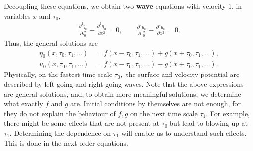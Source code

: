 \documentclass[10pt,reqno,oneside,a4paper]{article}
\begin{document}
Decoupling these equations, we obtain two \textbf{wave} equations with velocity 1, in variables $x$ and $\tau_0,$
\begin{align*}
\frac{\partial^2 \eta_{0}}{\partial \tau_0^2} - \frac{\partial^2\eta_{0}}{\partial x^2} = 0, \qquad \frac{\partial^2 u_{0}}{\partial \tau_0^2} - \frac{\partial^2 u_{0}}{\partial x^2} = 0.
\end{align*}
Thus, the general solutions are
\begin{align*}
\eta_{0}(x, \tau_0, \tau_1, \ldots) &= f(x- \tau_0, \tau_1, \ldots) + g(x+ \tau_0, \tau_1, \ldots), \\
u_{0}(x, \tau_0, \tau_1, \ldots) &= f(x- \tau_0, \tau_1, \ldots) - g(x+ \tau_0, \tau_1, \ldots).
\end{align*}
Physically, on the fastest time scale $\tau_0,$ the surface and velocity potential are described by left-going and right-going waves. Note that the above expressions are general solutions, and, to obtain more meaningful solutions, we determine what exactly $f$ and $g$ are. Initial conditions by themselves are not enough, for they do not explain the behaviour of $f,g$ on the next time scale $\tau_1.$ For example, there might be some effects that are not present at $\tau_0$ but lead to blowing up at $\tau_1.$ Determining the dependence on $\tau_1$ will enable us to understand such effects. This is done in the next order equations.
\end{document}

